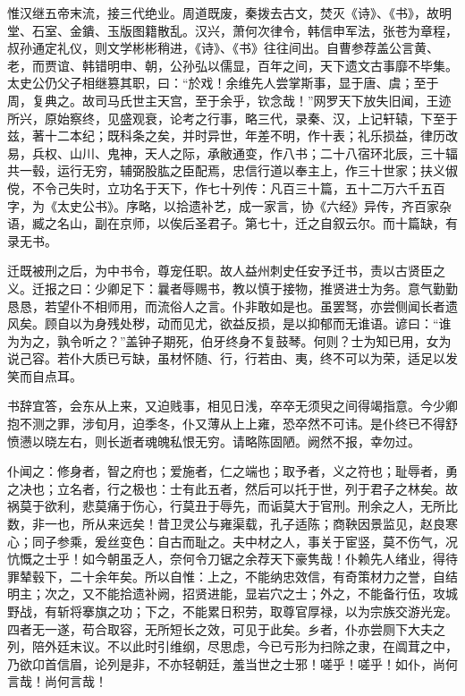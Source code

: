 \documentclass[12pt,UTF8]{ctexbook}
\begin{document}
惟汉继五帝末流，接三代绝业。周道既废，秦拨去古文，焚灭《诗》、《书》，故明堂、石室、金鐀、玉版图籍散乱。汉兴，萧何次律令，韩信申军法，张苍为章程，叔孙通定礼仪，则文学彬彬稍进，《诗》、《书》往往间出。自曹参荐盖公言黄、老，而贾谊、韩错明申、朝，公孙弘以儒显，百年之间，天下遗文古事靡不毕集。太史公仍父子相继篡其职，曰：“於戏！余维先人尝掌斯事，显于唐、虞；至于周，复典之。故司马氏世主天宫，至于余乎，钦念哉！”网罗天下放失旧闻，王迹所兴，原始察终，见盛观衰，论考之行事，略三代，录秦、汉，上记轩辕，下至于兹，著十二本纪；既科条之矣，并时异世，年差不明，作十表；礼乐损益，律历改易，兵权、山川、鬼神，天人之际，承敝通变，作八书；二十八宿环北辰，三十辐共一毂，运行无穷，辅弼股肱之臣配焉，忠信行道以奉主上，作三十世家；扶义俶傥，不令己失时，立功名于天下，作七十列传：凡百三十篇，五十二万六千五百字，为《太史公书》。序略，以拾遗补艺，成一家言，协《六经》异传，齐百家杂语，臧之名山，副在京师，以俟后圣君子。第七十，迁之自叙云尔。而十篇缺，有录无书。



迁既被刑之后，为中书令，尊宠任职。故人益州刺史任安予迁书，责以古贤臣之义。迁报之曰：少卿足下：曩者辱赐书，教以慎于接物，推贤进士为务。意气勤勤恳恳，若望仆不相师用，而流俗人之言。仆非敢如是也。虽罢驽，亦尝侧闻长者遗风矣。顾自以为身残处秽，动而见尤，欲益反损，是以抑郁而无谁语。谚曰：“谁为为之，孰令听之？”盖钟子期死，伯牙终身不复鼓琴。何则？士为知已用，女为说己容。若仆大质已亏缺，虽材怀随、行，行若由、夷，终不可以为荣，适足以发笑而自点耳。



书辞宜答，会东从上来，又迫贱事，相见日浅，卒卒无须臾之间得竭指意。今少卿抱不测之罪，涉旬月，迫季冬，仆又薄从上上雍，恐卒然不可讳。是仆终已不得舒愤懑以晓左右，则长逝者魂魄私恨无穷。请略陈固陋。阙然不报，幸勿过。



仆闻之：修身者，智之府也；爱施者，仁之端也；取予者，义之符也；耻辱者，勇之决也；立名者，行之极也：士有此五者，然后可以托于世，列于君子之林矣。故祸莫于欲利，悲莫痛于伤心，行莫丑于辱先，而诟莫大于官刑。刑余之人，无所比数，非一也，所从来远矣！昔卫灵公与雍渠载，孔子适陈；商鞅因景监见，赵良寒心；同子参乘，爰丝变色：自古而耻之。夫中材之人，事关于宦竖，莫不伤气，况忼慨之士乎！如今朝虽乏人，奈何令刀锯之余荐天下豪隽哉！仆赖先人绪业，得待罪辇毂下，二十余年矣。所以自惟：上之，不能纳忠效信，有奇策材力之誉，自结明主；次之，又不能拾遗补阙，招贤进能，显岩穴之士；外之，不能备行伍，攻城野战，有斩将搴旗之功；下之，不能累日积劳，取尊官厚禄，以为宗族交游光宠。四者无一遂，苟合取容，无所短长之效，可见于此矣。乡者，仆亦尝厕下大夫之列，陪外廷末议。不以此时引维纲，尽思虑，今已亏形为扫除之隶，在阘茸之中，乃欲卬首信眉，论列是非，不亦轻朝廷，羞当世之士邪！嗟乎！嗟乎！如仆，尚何言哉！尚何言哉！
\end{document}
